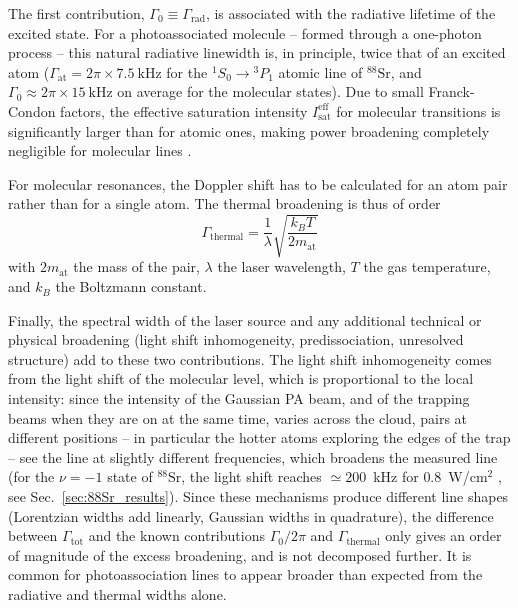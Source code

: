 The first contribution, $\Gamma_0 \equiv \Gamma_{\text{rad}}$, is associated with the radiative lifetime of the
excited state. For a photoassociated molecule -- formed through a one-photon process --
this natural radiative linewidth is, in principle, twice that of an excited atom
($\Gamma_{\text{at}} = 2\pi \times 7.5~\text{kHz}$ for the $^1S_0 \rightarrow {}^3P_1$ atomic line of
$^{88}\text{Sr}$, and $\Gamma_0 \approx 2\pi\times15~\text{kHz}$ on average for the molecular
states). Due to small Franck-Condon factors, the effective saturation intensity
$I_{\text{sat}}^{\text{eff}}$ for molecular transitions is significantly larger than for
atomic ones, making power broadening completely negligible for molecular lines
\cite{zelevinsky_narrow_2006}.

For molecular resonances, the Doppler shift has to be calculated for an atom pair rather
than for a single atom. The thermal broadening is thus of order
\begin{equation}
\Gamma_{\text{thermal}} = \frac{1}{\lambda}\sqrt{\frac{k_B T}{2m_{\text{at}}}}
\end{equation}
with $2m_{\text{at}}$ the mass of the pair, $\lambda$ the laser wavelength, $T$ the gas
temperature, and $k_B$ the Boltzmann constant.

Finally, the spectral width of the laser source and any additional technical or
physical broadening (light shift inhomogeneity, predissociation, unresolved
structure) add to these two contributions. The light shift inhomogeneity comes from the
light shift of the molecular level, which is proportional to the local intensity: since
the intensity of the Gaussian PA beam, and of the trapping beams when they are on at the
same time, varies across the cloud, pairs at different positions -- in particular the
hotter atoms exploring the edges of the trap -- see the line at slightly different
frequencies, which broadens the measured line (for the $\nu=-1$ state of
$^{88}\text{Sr}$, the light shift reaches $\simeq200$~kHz for $0.8$~W/cm$^2$
\cite{blatt_measurement_2011}, see Sec.~\ref{sec:88Sr_results}). Since these mechanisms produce
different line shapes (Lorentzian widths add linearly, Gaussian widths in
quadrature), the difference between $\Gamma_{\text{tot}}$ and the known
contributions $\Gamma_0/2\pi$ and $\Gamma_{\text{thermal}}$ only gives an order of
magnitude of the excess broadening, and is not decomposed further. It is common
for photoassociation lines to appear broader than expected from the radiative and
thermal widths alone.


